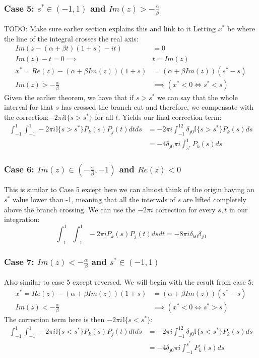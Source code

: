 \documentclass{article}
\begin{document}
\subsubsection{Case 5: $s^*\in(-1,1)$ and $Im(z)>-\frac{\alpha}{\beta}$}
TODO: Make sure earlier section explains this and link to it
Letting $x^*$ be where the line of the integral crosses the real axis:
\begin{align}
    Im(z-(\alpha+\beta t)(1+s)-it)&=0\\
    Im(z)-t=0\implies &t=Im(z)\\
    x^*=Re(z)-(\alpha+\beta Im(z))(1+s)&=(\alpha+\beta Im(z))(s^*-s)\\
    Im(z)>-\frac{\alpha}{\beta}&\implies (x^*<0 \iff s^*<s)
\end{align}
Given the earlier theorem, we have that if $s>s^*$ we can say that the whole interval for that $s$ has crossed the branch cut and therefore, we compensate with the correction:$-2\pi i\mathbb{I}\{s>s^*\}$ for all $t$.
Yields our final correction term:
\begin{align}
    \int_{-1}^1\int_{-1}^1-2\pi i\mathbb{I}\{s>s^*\}P_k(s)P_j(t)dtds&=-2\pi i\int_{-1}^12\delta_{j0}\mathbb{I}\{s>s^*\}P_k(s)ds\\
    &=-4\delta_{j0}\pi i\int_{s^*}^1P_k(s)ds
\end{align}

\subsubsection{Case 6: $Im(z)\in(-\frac{\alpha}{\beta},-1)$ and $Re(z)<0$}
This is similar to Case 5 except here we can almost think of the origin having an $s^*$ value lower than -1, meaning that all the intervals of $s$ are lifted completely above the branch crossing.
We can use the $-2\pi i$ correction for every $s,t$ in our integration:
$$\int_{-1}^1\int_{-1}^1-2\pi iP_k(s)P_j(t)dsdt=-8\pi i\delta_{k0}\delta_{j0}$$

\subsubsection{Case 7: $Im(z)<-\frac{\alpha}{\beta}$ and $s^*\in(-1,1)$}
Also similar to case 5 except reversed.
We will begin with the result from case 5:
\begin{align}
    x^*=Re(z)-(\alpha+\beta Im(z))(1+s)&=(\alpha+\beta Im(z))(s^*-s)\\
    Im(z)<-\frac{\alpha}{\beta}&\implies (x^*<0 \iff s^*>s)
\end{align}
The correction term here is then $-2\pi i\mathbb{I}\{s<s^*\}$:
\begin{align}
    \int_{-1}^1\int_{-1}^1-2\pi i\mathbb{I}\{s<s^*\}P_k(s)P_j(t)dtds&=-2\pi i\int_{-1}^12\delta_{j0}\mathbb{I}\{s<s^*\}P_k(s)ds\\
    &=-4\delta_{j0}\pi i\int_{-1}^{s^*}P_k(s)ds
\end{align}
\end{document}
